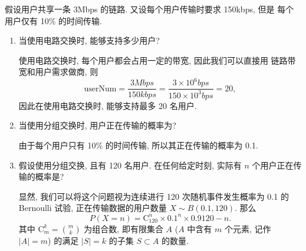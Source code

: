 \documentclass[10pt,UTF8]{book} %
\begin{document}
\begin{example}
    假设用户共享一条 3Mbps 的链路. 又设每个用户传输时要求 150kbps, 但是
    每个用户仅有 10\% 的时间传输.
    \begin{enumerate}[label={$\left.\mathrm{\alph*}\right)$}, itemsep=0pt]
        \item 当使用电路交换时, 能够支持多少用户?
        \begin{sol}
            使用电路交换时, 每个用户都会占用一定的带宽, 因此我们可以直接用
            链路带宽和用户需求做商, 则
            \[ \mathrm{userNum} = \dfrac{3 \si{Mbps}}{150 \si{kbps}}
            = \dfrac{3 \times 10^6 \si{bps}}{150 \times 10^3 \si{bps}}
            = 20, \]
            因此在使用电路交换时, 能够支持最多 20 名用户.
        \end{sol}
        \item 当使用分组交换时, 用户正在传输的概率为?
        \begin{sol}
            由于每个用户只有 10\% 的时间传输, 所以其正在传输的概率为 0.1.
        \end{sol}
        \item 假设使用分组交换, 且有 120 名用户. 在任何给定时刻, 实际有 $n$
        个用户正在传输的概率是?
        \begin{sol}
            显然, 我们可以将这个问题视为连续进行 120 次随机事件发生概率为 0.1 
            的 Bernoulli 试验,
            正在传输数据的用户数量 $X \sim B(0.1, 120)$. 那么
            \[ P(X = n) = \mathrm{C}_{120}^n \times 0.1^n
            \times 0.9{120-n}. \]
            其中 $\mathrm{C}_m^k = \binom{m}{k}$ 为组合数, 即有限集合 $A$
            ($A$ 中含有 $m$ 个元素, 记作 $|A| = m$)
            的满足 $|S| = k$ 的子集 $S \subset A$ 的数量.
        \end{sol}
    \end{enumerate}
\end{example}
\end{document}
